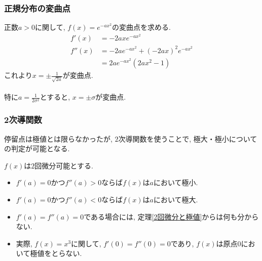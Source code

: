 



\begin{frame}
\frametitle{正規分布の変曲点}

正数$a>0$に関して, $f(x)=e^{-ax^2}$の変曲点を求める. 
\begin{align*}
f'(x) & = -2axe^{-ax^2} \\
f''(x) & = -2ae^{-ax^2} + (-2ax)^2e^{-ax^2} \\
&= 2ae^{-ax^2} (2ax^2-1)
\end{align*}
これより$x=\pm \frac{1}{\sqrt{2a}}$が変曲点. \\
\ \\

特に$a=\frac{1}{2\sigma^2}$とすると, $x=\pm \sigma$が変曲点. 

\end{frame}



\begin{frame}
\frametitle{2次導関数}

停留点は極値とは限らなかったが, $2$次導関数を使うことで, 極大・極小についての判定が可能となる. 


\begin{Thm} \label{2回微分と極値}
$f(x)$は$2$回微分可能とする. 
\begin{itemize}
\item $f'(a)=0$かつ$f''(a)>0$ならば$f(x)$は$a$において極小. 
\item $f'(a)=0$かつ$f''(a)<0$ならば$f(x)$は$a$において極大.  
\end{itemize}
\end{Thm}

\begin{itemize}
\item $f'(a)=f''(a)=0$である場合には, 定理\ref{2回微分と極値}からは何も分からない. 
\item 実際, $f(x)=x^3$に関して, $f'(0)=f''(0)=0$であり, $f(x)$は原点$0$において極値をとらない.  
\end{itemize}
\end{frame}


